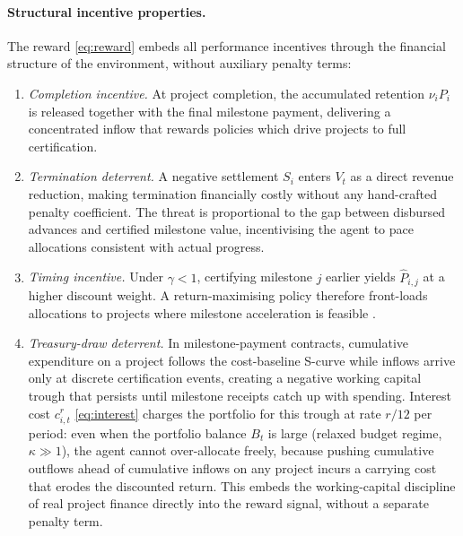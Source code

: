 \paragraph{Structural incentive properties.}
The reward \eqref{eq:reward} embeds all performance incentives through
the financial structure of the environment, without auxiliary penalty
terms:

\begin{enumerate}[label=(\roman*)]
  \item \emph{Completion incentive.} At project completion, the
    accumulated retention $\nu_i P_i$ is released together with the
    final milestone payment, delivering a concentrated inflow that
    rewards policies which drive projects to full certification.

  \item \emph{Termination deterrent.} A negative settlement $S_i$
    enters $V_t$ as a direct revenue reduction, making termination
    financially costly without any hand-crafted penalty coefficient.
    The threat is proportional to the gap between disbursed advances
    and certified milestone value, incentivising the agent to pace
    allocations consistent with actual progress.

  \item \emph{Timing incentive.} Under $\gamma < 1$, certifying
    milestone $j$ earlier yields $\hat{P}_{i,j}$ at a higher discount
    weight. A return-maximising policy therefore front-loads
    allocations to projects where milestone acceleration is
    feasible \citep{Damodaran2012}.

    \item \emph{Treasury-draw deterrent.} In milestone-payment
    contracts, cumulative expenditure on a project follows the
    cost-baseline S-curve while inflows arrive only at discrete
    certification events, creating a negative working capital trough
    that persists until milestone receipts catch up with spending.
    Interest cost $c^r_{i,t}$ \eqref{eq:interest} charges the
    portfolio for this trough at rate $r/12$ per period: even when
    the portfolio balance $B_t$ is large (relaxed budget regime,
    $\kappa \gg 1$), the agent cannot over-allocate freely, because
    pushing cumulative outflows ahead of cumulative inflows on any
    project incurs a carrying cost that erodes the discounted return.
    This embeds the working-capital discipline of real project
    finance directly into the reward signal, without a separate
    penalty term.
\end{enumerate}

